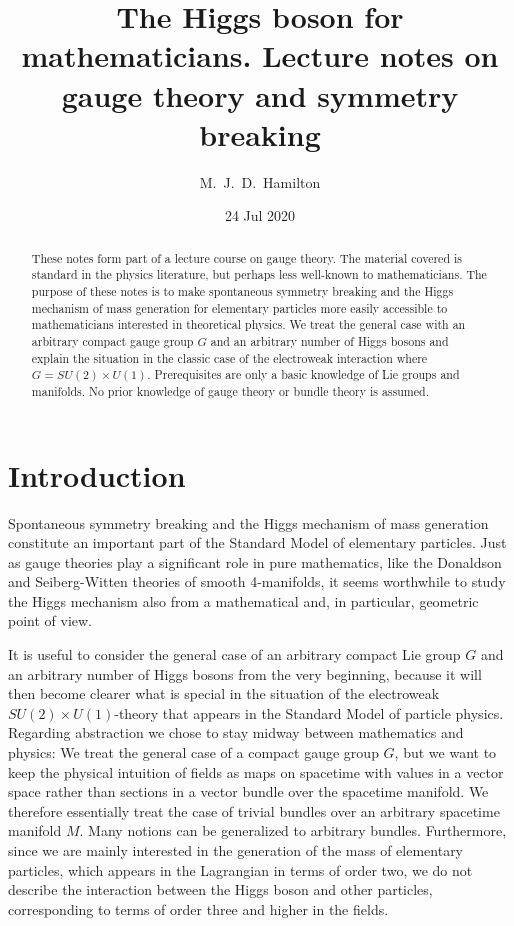 \documentclass[12pt]{amsart}
\title[The Higgs boson for mathematicians]{The Higgs boson for mathematicians. Lecture notes on gauge theory and symmetry breaking}
\author{M.~J.~D.~Hamilton}
\date{24 Jul 2020 }
\theoremstyle{definition}
\theoremstyle{remark}
\numberwithin{equation}{section}
\begin{document}
\begin{abstract}These notes form part of a lecture course on gauge theory. The material covered is standard in the physics literature, but perhaps less well-known to mathematicians. The purpose of these notes is to make spontaneous symmetry breaking and the Higgs mechanism of mass generation for elementary particles more easily accessible to mathematicians interested in theoretical physics. We treat the general case with an arbitrary compact gauge group $G$ and an arbitrary number of Higgs bosons and explain the situation in the classic case of the electroweak interaction where $G=SU(2)\times U(1)$. Prerequisites are only a basic knowledge of Lie groups and manifolds. No prior knowledge of gauge theory or bundle theory is assumed.
\end{abstract}

\maketitle

\section{Introduction}
Spontaneous symmetry breaking and the Higgs mechanism of mass generation constitute an important part of the Standard Model of elementary particles. Just as gauge theories play a significant role in pure mathematics, like the Donaldson and Seiberg-Witten theories of smooth 4-manifolds, it seems worthwhile to study the Higgs mechanism also from a mathematical and, in particular, geometric point of view.

It is useful to consider the general case of an arbitrary compact Lie group $G$ and an arbitrary number of Higgs bosons from the very beginning, because it will then become clearer what is special in the situation of the electroweak $SU(2)\times U(1)$-theory that appears in the Standard Model of particle physics. Regarding abstraction we chose to stay midway between mathematics and physics: We treat the general case of a compact gauge group $G$, but we want to keep the physical intuition of fields as maps on spacetime with values in a vector space rather than sections in a vector bundle over the spacetime manifold. We therefore essentially treat the case of trivial bundles over an arbitrary spacetime manifold $M$. Many notions can be generalized to arbitrary bundles. Furthermore, since we are mainly interested in the generation of the mass of elementary particles, which appears in the Lagrangian in terms of order two, we do not describe the interaction between the Higgs boson and other particles, corresponding to terms of order three and higher in the fields.
\end{document}
